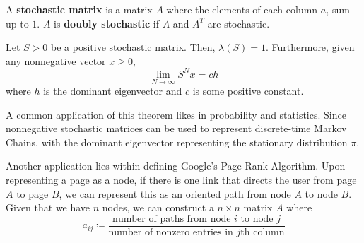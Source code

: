 \documentclass{article}
\newcounter{theorem}[section]
\newcounter{definition}[section]
\begin{document}
  \begin{definition}
    A \textbf{stochastic matrix} is a matrix $A$ where the elements of each column $a_i$ sum up to $1$. $A$ is \textbf{doubly stochastic} if $A$ and $A^T$ are stochastic. 
  \end{definition}

  \begin{theorem}
    Let $S > 0$ be a positive stochastic matrix. Then, $\lambda(S) = 1$. Furthermore, given any nonnegative vector $x \geq 0$, 
    \begin{equation}
      \lim_{N \rightarrow \infty} S^N x = c h
    \end{equation}
    where $h$ is the dominant eigenvector and $c$ is some positive constant. 
  \end{theorem}

  A common application of this theorem likes in probability and statistics. Since nonnegative stochastic matrices can be used to represent discrete-time Markov Chains, with the dominant eigenvector representing the stationary distribution $\pi$. 

  Another application lies within defining Google's Page Rank Algorithm. Upon representing a page as a node, if there is one link that directs the user from page $A$ to page $B$, we can represent this as an oriented path from node $A$ to node $B$. Given that we have $n$ nodes, we can construct a $n \times n$ matrix $A$ where 
  \begin{equation}
    a_{i j} \coloneqq  \frac{\text{number of paths from node $i$ to node $j$}}{\text{number of nonzero entries in $j$th column}}
  \end{equation}
\end{document}
